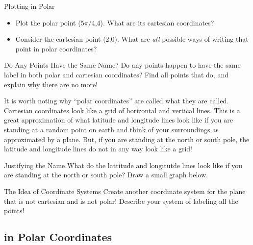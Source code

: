 \begin{exercise}{Plotting in Polar \Coffeecup \Coffeecup}
\begin{itemize}
\item Plot the polar point ($5\pi/4$,4).  What are its cartesian coordinates?
\vspace*{1in}
\item Consider the cartesian point (2,0).  What are \emph{all} possible ways of writing that point in polar coordinates?
\vspace*{1in}
\end{itemize}
\end{exercise}

\begin{exercise}{Do Any Points Have the Same Name? \Coffeecup \Coffeecup \Coffeecup }
Do any points happen to have the same label in both polar and cartesian coordinates?  Find all points that do, and explain why there are no more!  \vspace*{.5in}
\end{exercise}

It is worth noting why ``polar coordinates'' are called what they are called.  Cartesian coordinates look like a grid of horizontal and vertical lines.  This is a great approximation of what latitude and longitude lines look like if you are standing at a random point on earth and think of your surroundings as approximated by a plane.  But, if you are standing at the north or south pole, the latitude and longitude lines do not in any way look like a grid!

\begin{exercise}{Justifying the Name \Coffeecup \Coffeecup}
What do the lattitude and longitutde lines look like if you are standing at the north or south pole?  Draw a small graph below.  \vspace*{.5in}
\end{exercise}

\begin{exercise}{The Idea of Coordinate Systems \Coffeecup \Coffeecup \Coffeecup \Coffeecup}
Create another coordinate system for the plane that is not cartesian and is not polar!  Describe your system of labeling all the points!
\vspace*{1in}
\end{exercise}

\subsection{ in Polar Coordinates}

